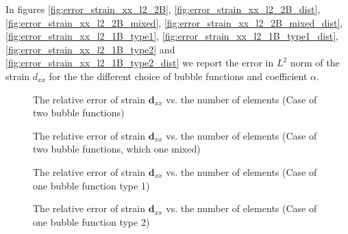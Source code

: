 \documentclass[preprint,12pt,authoryear]{elsarticle}
\begin{document}
In figures \ref{fig:error_strain_xx_l2_2B}, \ref{fig:error_strain_xx_l2_2B_dist}, \ref{fig:error_strain_xx_l2_2B_mixed}, \ref{fig:error_strain_xx_l2_2B_mixed_dist}, \ref{fig:error_strain_xx_l2_1B_type1}, \ref{fig:error_strain_xx_l2_1B_type1_dist}, 
\ref{fig:error_strain_xx_l2_1B_type2} and 
\ref{fig:error_strain_xx_l2_1B_type2_dist} we report the error in $L^{2}$ norm of the strain $d_{xx}$ for the the different choice of bubble functions and coefficient $\alpha$.
\begin{figure}[h!]
\begin{center}
\caption{The relative error of strain $\bm{d}_{xx}$ vs. 
the number of elements (Case of two bubble functions)}
\end{center}
\end{figure}
%
\begin{figure}[h!]
\begin{center}
\caption{The relative error of strain $\bm{d}_{xx}$ vs. 
the number of elements (Case of two bubble functions, which one mixed)}
\end{center}
\end{figure}
%
\begin{figure}[h!]
\begin{center}
\caption{The relative error of strain $\bm{d}_{xx}$ vs. 
the number of elements (Case of one bubble function type 1)}
\end{center}
\end{figure}
%
\begin{figure}[h!]
\begin{center}
\caption{The relative error of strain $\bm{d}_{xx}$ vs. 
the number of elements (Case of one bubble function type 2)}
\end{center}
\end{figure}
\end{document}
